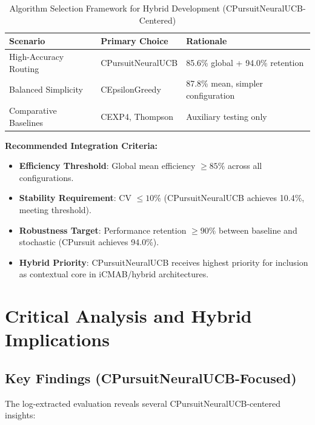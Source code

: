 \documentclass[12pt,a4paper]{article}
\begin{document}
\begin{table}[H]
\centering
\caption{Algorithm Selection Framework for Hybrid Development (CPursuitNeuralUCB-Centered)}
\begin{tabular}{@{}lll@{}}
\toprule
\textbf{Scenario} & \textbf{Primary Choice} & \textbf{Rationale} \\
\midrule
High-Accuracy Routing & CPursuitNeuralUCB & 85.6\% global + 94.0\% retention \\
Balanced Simplicity   & CEpsilonGreedy     & 87.8\% mean, simpler configuration \\
Comparative Baselines & CEXP4, Thompson    & Auxiliary testing only \\
\bottomrule
\end{tabular}
\end{table}

\textbf{Recommended Integration Criteria:}
\begin{itemize}
    \item \textbf{Efficiency Threshold}: Global mean efficiency $\geq 85\%$ across all configurations.
    \item \textbf{Stability Requirement}: CV $\leq 10\%$ (CPursuitNeuralUCB achieves 10.4\%, meeting threshold).
    \item \textbf{Robustness Target}: Performance retention $\geq 90\%$ between baseline and stochastic (CPursuit achieves 94.0\%).
    \item \textbf{Hybrid Priority}: CPursuitNeuralUCB receives highest priority for inclusion as contextual core in iCMAB/hybrid architectures.
\end{itemize}

\newpage
\section{Critical Analysis and Hybrid Implications}

\subsection{Key Findings (CPursuitNeuralUCB-Focused)}

The log-extracted evaluation reveals several CPursuitNeuralUCB-centered insights:
\end{document}

